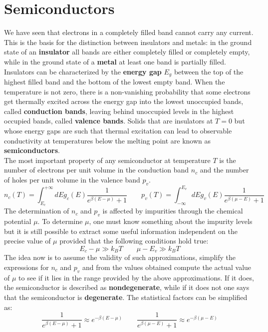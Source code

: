 \documentclass[10.75pt,a4paper,openright,bottom=2cm]{article}
\begin{document}
\section{Semiconductors}
We have seen that electrons in a completely filled band cannot carry any current. This is the basis for the distinction between insulators and metals: in the ground state of an \textbf{insulator} all bands are either completely filled or completely empty, while in the ground state of a \textbf{metal} at least one band is partially filled. Insulators can be characterized by the \textbf{energy gap} $E_g$ between the top of the highest filled band and the bottom of the lowest empty band. When the temperature is not zero, there is a non-vanishing probability that some electrons get thermally excited across the energy gap into the lowest unoccupied bands, called \textbf{conduction bands}, leaving behind unoccupied levels in the highest occupied bands, called \textbf{valence bands}. Solids that are insulators at $T=0$ but whose energy gaps are such that thermal excitation can lead to observable conductivity at temperatures below the melting point are known as \textbf{semiconductors}.\\
The most important property of any semiconductor at temperature $T$ is the number of electrons per unit volume in the conduction band $n_c$ and the number of holes per unit volume in the valence band $p_v$.
\[
n_c(T)=\int_{E_c}^{+\infty} dEg_c(E)\frac{1}{e^{\beta(E-\mu)}+1} \qquad p_v(T)=\int_{-\infty}^{E_v}dEg_v(E)\frac{1}{e^{\beta(\mu-E)}+1}
\]
The determination of $n_c$ and $p_v$ is affected by impurities through the chemical potential $\mu$. To determine $\mu$, one must know something about the impurity levels but it is still possible to extract some useful information independent on the precise value of $\mu$ provided that the following conditions hold true:
\begin{equation}
\label{nondeg}
E_c-\mu\gg k_BT \qquad \mu-E_v\gg k_BT
\end{equation}
The idea now is to assume the validity of such approximations, simplify the expressions for $n_c$ and $p_v$ and from the values obtained compute the actual value of $\mu$ to see if it lies in the range provided by the above approximations. If it does, the semiconductor is described as \textbf{nondegenerate}, while if it does not one says that the semiconductor is \textbf{degenerate}. The statistical factors can be simplified as:
\[
\frac{1}{e^{\beta(E-\mu)}+1}\approx e^{-\beta(E-\mu)} \qquad \frac{1}{e^{\beta(\mu-E)}+1}\approx e^{-\beta(\mu-E)}
\]
\end{document}
